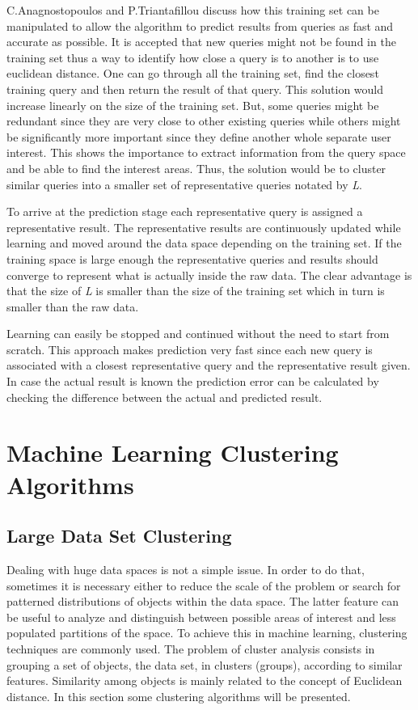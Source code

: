 \documentclass{lmproj}
\begin{document}
C.Anagnostopoulos and P.Triantafillou\cite{learningCount} discuss how this training set can be manipulated to allow the algorithm to predict results from queries as fast and accurate as possible. It is accepted that new queries might not be found in the training set thus a way to identify how close a query is to another is to use euclidean distance. One can go through all the training set, find the closest training query and then return the result of that query. This solution would increase linearly on the size of the training set. But, some queries might be redundant since they are very close to other existing queries while others might be significantly more important since they define another whole separate user interest. This shows the importance to extract information from the query space and be able to find the interest areas. Thus, the solution would be to cluster similar queries into a smaller set of representative queries notated by \textit{L}.

To arrive at the prediction stage each representative query is assigned a representative result. The representative results are continuously updated while learning and moved around the data space depending on the training set. If the training space is large enough the representative queries and results should converge to represent what is actually inside the raw data. The clear advantage is that the size of \textit{L} is smaller than the size of the training set which in turn is smaller than the raw data.\cite{learningCount}

Learning can easily be stopped and continued without the need to start from scratch. This approach makes prediction very fast since each new query is associated with a closest representative query and the representative result given. In case the actual result is known the prediction error can be calculated by checking the difference between the actual and predicted result.\cite{learningCount}

\chapter{Machine Learning Clustering Algorithms}
\label{clustering}

\section{Large Data Set Clustering}
Dealing with huge data spaces is not a simple issue. In order to do that, sometimes it is necessary either to reduce the scale of the problem or search for patterned distributions of objects within the data space. The latter feature can be useful to analyze and distinguish between possible areas of interest and less populated partitions of the space. To achieve this in machine learning, clustering techniques are commonly used. The problem of cluster analysis consists in grouping a set of objects, the data set, in clusters (groups), according to similar features. Similarity among objects is mainly related to the concept of Euclidean distance. In this section some clustering algorithms will be presented.
\end{document}
